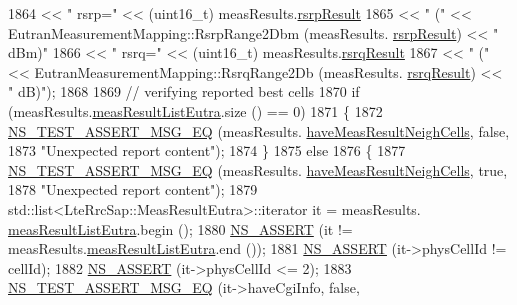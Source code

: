 \begin{DoxyCode}
1864                          << \textcolor{stringliteral}{" rsrp="} << (uint16\_t) measResults.\hyperlink{structns3_1_1LteRrcSap_1_1MeasResults_a4d7bf8765525493fe5f5cccdbf94ab8b}{rsrpResult}
1865                          << \textcolor{stringliteral}{" ("} << EutranMeasurementMapping::RsrpRange2Dbm (measResults.
      \hyperlink{structns3_1_1LteRrcSap_1_1MeasResults_a4d7bf8765525493fe5f5cccdbf94ab8b}{rsrpResult}) << \textcolor{stringliteral}{" dBm)"}
1866                          << \textcolor{stringliteral}{" rsrq="} << (uint16\_t) measResults.\hyperlink{structns3_1_1LteRrcSap_1_1MeasResults_a6a64246cfa5d09eb42120890de3dca32}{rsrqResult}
1867                          << \textcolor{stringliteral}{" ("} << EutranMeasurementMapping::RsrqRange2Db (measResults.
      \hyperlink{structns3_1_1LteRrcSap_1_1MeasResults_a6a64246cfa5d09eb42120890de3dca32}{rsrqResult}) << \textcolor{stringliteral}{" dB)"});
1868 
1869       \textcolor{comment}{// verifying reported best cells}
1870       \textcolor{keywordflow}{if} (measResults.\hyperlink{structns3_1_1LteRrcSap_1_1MeasResults_a1fc2cdef154508dd522b46c71f854f03}{measResultListEutra}.size () == 0)
1871         \{
1872           \hyperlink{group__testing_ga2a9d78cffb3db8e867c35fff0b698cf5}{NS\_TEST\_ASSERT\_MSG\_EQ} (measResults.
      \hyperlink{structns3_1_1LteRrcSap_1_1MeasResults_a1a102ebfb647fe85739933dcd2532736}{haveMeasResultNeighCells}, \textcolor{keyword}{false},
1873                                  \textcolor{stringliteral}{"Unexpected report content"});
1874         \}
1875       \textcolor{keywordflow}{else}
1876         \{
1877           \hyperlink{group__testing_ga2a9d78cffb3db8e867c35fff0b698cf5}{NS\_TEST\_ASSERT\_MSG\_EQ} (measResults.
      \hyperlink{structns3_1_1LteRrcSap_1_1MeasResults_a1a102ebfb647fe85739933dcd2532736}{haveMeasResultNeighCells}, \textcolor{keyword}{true},
1878                                  \textcolor{stringliteral}{"Unexpected report content"});
1879           std::list<LteRrcSap::MeasResultEutra>::iterator it = measResults.
      \hyperlink{structns3_1_1LteRrcSap_1_1MeasResults_a1fc2cdef154508dd522b46c71f854f03}{measResultListEutra}.begin ();
1880           \hyperlink{assert_8h_a6dccdb0de9b252f60088ce281c49d052}{NS\_ASSERT} (it != measResults.\hyperlink{structns3_1_1LteRrcSap_1_1MeasResults_a1fc2cdef154508dd522b46c71f854f03}{measResultListEutra}.end ());
1881           \hyperlink{assert_8h_a6dccdb0de9b252f60088ce281c49d052}{NS\_ASSERT} (it->physCellId != cellId);
1882           \hyperlink{assert_8h_a6dccdb0de9b252f60088ce281c49d052}{NS\_ASSERT} (it->physCellId <= 2);
1883           \hyperlink{group__testing_ga2a9d78cffb3db8e867c35fff0b698cf5}{NS\_TEST\_ASSERT\_MSG\_EQ} (it->haveCgiInfo, \textcolor{keyword}{false},

\end{DoxyCode}
